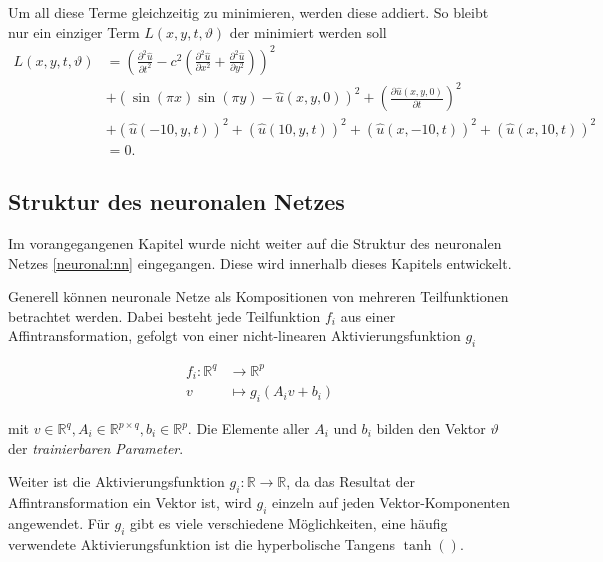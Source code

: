 Um all diese Terme gleichzeitig zu minimieren, werden diese addiert. So bleibt nur ein einziger Term \( L(x, y, t, \vartheta) \) der minimiert werden soll
\begin{equation}
    \begin{aligned}
        L(x, y, t, \vartheta) &= \left(\frac{\partial^2 \hat{u}}{\partial t^2} - c^2 \left( \frac{\partial^2 \hat{u}}{\partial x^2} + \frac{\partial^2 \hat{u}}{\partial y^2} \right)\right)^2\\
        &+ \left(\sin(\pi x) \sin(\pi y) - \hat{u}(x, y, 0)\right)^2
        + \left(\frac{\partial \hat{u}(x, y, 0)}{\partial t}\right)^2\\
        &+ \left(\hat{u}(-10, y, t)\right)^2
        + \left(\hat{u}(10, y, t)\right)^2
        + \left(\hat{u}(x, -10, t)\right)^2
        + \left(\hat{u}(x, 10, t)\right)^2\\
        &= 0.
    \end{aligned}
    \label{neuronal:optimierung}
\end{equation}


\subsection{Struktur des neuronalen Netzes}\label{neuronal:subsection:struktur_nn}

Im vorangegangenen Kapitel wurde nicht weiter auf die Struktur des neuronalen Netzes \eqref{neuronal:nn} eingegangen.
Diese wird innerhalb dieses Kapitels entwickelt.

Generell können neuronale Netze als Kompositionen von mehreren Teilfunktionen betrachtet werden.
Dabei besteht jede Teilfunktion \( f_i \) aus einer Affintransformation, gefolgt von einer nicht-linearen Aktivierungsfunktion \( g_i \)

\begin{align*}
    f_i\colon \mathbb{R}^q & \longrightarrow\mathbb{R}^p \\[-1ex]
    v & \longmapsto g_i(A_iv + b_i)
\end{align*}

mit \( v \in \mathbb{R}^q, A_i \in \mathbb{R}^{p \times q}, b_i \in \mathbb{R}^p \). 
Die Elemente aller \( A_i \) und \( b_i \) bilden den Vektor \( \vartheta \) der \emph{trainierbaren Parameter}.

Weiter ist die Aktivierungsfunktion \( g_i\colon \mathbb{R} \longrightarrow\mathbb{R} \), da das Resultat der Affintransformation ein Vektor ist, wird \( g_i \) einzeln auf jeden Vektor-Komponenten angewendet.
Für \( g_i \) gibt es viele verschiedene Möglichkeiten, eine häufig verwendete Aktivierungsfunktion ist die hyperbolische Tangens \( \tanh() \).

